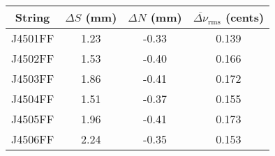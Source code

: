 \begin{tabular}{cccc}
\toprule
String & $\Delta S$ (mm) & $\Delta N$ (mm) & $\overline{\Delta \nu}_\text{rms}$ (cents) \\
\midrule
J4501FF & 1.23 & -0.33 & 0.139 \\
J4502FF & 1.53 & -0.40 & 0.166 \\
J4503FF & 1.86 & -0.41 & 0.172 \\
J4504FF & 1.51 & -0.37 & 0.155 \\
J4505FF & 1.96 & -0.41 & 0.173 \\
J4506FF & 2.24 & -0.35 & 0.153 \\
\bottomrule
\end{tabular}
